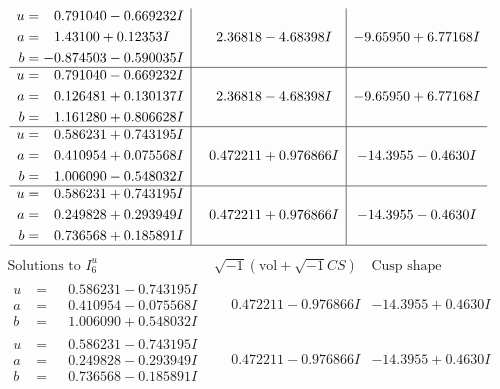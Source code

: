 \documentclass[1p]{elsarticle_modified}
\theoremstyle{definition}
\newcommand{\I}{\sqrt{-1}}
\begin{document}
$$\begin{array}{c|c|c}
\begin{aligned}
u &= \phantom{-}0.791040 - 0.669232 I \\
a &= \phantom{-}1.43100 + 0.12353 I \\
b &= -0.874503 - 0.590035 I\end{aligned}
 & \phantom{-}2.36818 - 4.68398 I & -9.65950 + 6.77168 I \\ \hline\begin{aligned}
u &= \phantom{-}0.791040 - 0.669232 I \\
a &= \phantom{-}0.126481 + 0.130137 I \\
b &= \phantom{-}1.161280 + 0.806628 I\end{aligned}
 & \phantom{-}2.36818 - 4.68398 I & -9.65950 + 6.77168 I \\ \hline\begin{aligned}
u &= \phantom{-}0.586231 + 0.743195 I \\
a &= \phantom{-}0.410954 + 0.075568 I \\
b &= \phantom{-}1.006090 - 0.548032 I\end{aligned}
 & \phantom{-}0.472211 + 0.976866 I & -14.3955 - 0.4630 I \\ \hline\begin{aligned}
u &= \phantom{-}0.586231 + 0.743195 I \\
a &= \phantom{-}0.249828 + 0.293949 I \\
b &= \phantom{-}0.736568 + 0.185891 I\end{aligned}
 & \phantom{-}0.472211 + 0.976866 I & -14.3955 - 0.4630 I\\
 \hline 
 \end{array}$$\newpage$$\begin{array}{c|c|c}  
\text{Solutions to }I^u_{6}& \I (\text{vol} + \sqrt{-1}CS) & \text{Cusp shape}\\
 \hline 
\begin{aligned}
u &= \phantom{-}0.586231 - 0.743195 I \\
a &= \phantom{-}0.410954 - 0.075568 I \\
b &= \phantom{-}1.006090 + 0.548032 I\end{aligned}
 & \phantom{-}0.472211 - 0.976866 I & -14.3955 + 0.4630 I \\ \hline\begin{aligned}
u &= \phantom{-}0.586231 - 0.743195 I \\
a &= \phantom{-}0.249828 - 0.293949 I \\
b &= \phantom{-}0.736568 - 0.185891 I\end{aligned}
 & \phantom{-}0.472211 - 0.976866 I & -14.3955 + 0.4630 I \\ \hline\begin{aligned}

\end{aligned}
\end{array}$$
\end{document}
